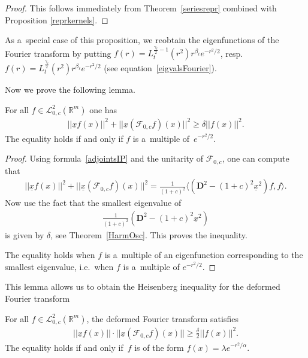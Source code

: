 \documentclass[pdftex]{sigma}
\numberwithin{equation}{section}
\numberwithin{theorem}{section}
\numberwithin{proposition}{section}
\numberwithin{lemma}{section}
\numberwithin{corollary}{section}
\numberwithin{definition}{section}
\numberwithin{example}{section}
\numberwithin{remark}{section}
\numberwithin{note}{section}
\theoremstyle{remark}
\newcommand{\mR}{\mathbb{R}}
\newcommand{\cF}{\mathcal{F}}
\newcommand{\cL}{\mathcal{L}}
\newcommand{\dD}{\textbf{D}}
\newcommand{\ux}{\underline{x}}
\def\a{{\alpha}}
\def\l{{\lambda}}
\def\d{{\delta}}
\def\la{{\langle}}
\def\ra{{\rangle}}
\begin{document}
\begin{proof}
This follows immediately from Theorem~\ref{seriesrepr} combined with Proposition \ref{reprkernels}.
\end{proof}

\begin{remark}
As a~special case of this proposition, we reobtain the eigenfunctions of the Fourier transform by
putting $f(r)=L_{t}^{\frac{\gamma_{\ell}}{2}-1}(r^{2})r^{\beta_{\ell}}e^{-r^{2}/2}$, resp.\
$f(r)=L_{t}^{\frac{\gamma_{\ell}}{2}}(r^{2})r^{\beta_{\ell}}e^{-r^{2}/2}$ (see equation~\eqref{eigvalsFourier}).
\end{remark}

Now we prove the following lemma.

\begin{lemma}\label{HeisenbergLemma}
For all $f\in\cL^{2}_{0,c}(\mR^{m})$ one has
\begin{gather*}
||\ux f(x)||^{2}+||\ux\left(\cF_{0,c}f\right)(x)||^{2}\geq\d||f(x)||^{2}.
\end{gather*}
The equality holds if and only if $f$ is a~multiple of~$e^{-r^{2}/2}$.
\end{lemma}

\begin{proof}
Using formula~\eqref{adjointsIP} and the unitarity of $\cF_{0,c}$, one can compute that
\begin{gather*}
||\ux f(x)||^{2}+||\ux\left(\cF_{0,c}f\right)(x)||^{2}=\frac{1}{(1+c)^{2}}\la
\left(\dD^{2}-(1+c)^{2}\ux^{2}\right)f,f\ra.
\end{gather*}
Now use the fact that the smallest eigenvalue of
\begin{gather*}
\frac{1}{(1+c)^{2}}\left(\dD^{2}-(1+c)^{2}\ux^{2}\right)
\end{gather*}
is given by $\d$, see Theorem~\ref{HarmOsc}.
This proves the inequality.

The equality holds when $f$ is a~multiple of an eigenfunction corresponding to the smallest
eigenvalue, i.e.\
when
$f$ is a~multiple of $e^{-r^{2}/2}$.
\end{proof}

This lemma allows us to obtain the Heisenberg inequality for the deformed Fourier transform
\begin{proposition}\label{Heisenberg}
For all $f\in\cL^{2}_{0,c}(\mR^{m})$, the deformed Fourier transform satisfies
\begin{gather*}
||\ux f(x)|| \cdot
||\ux\left(\cF_{0,c}f\right)(x)||\geq\frac{\d}{2}||f(x)||^{2}.
\end{gather*}
The equality holds if and only if~$f$ is of the form $f(x)=\l e^{-r^{2}/\a}$.
\end{proposition}
\end{document}
